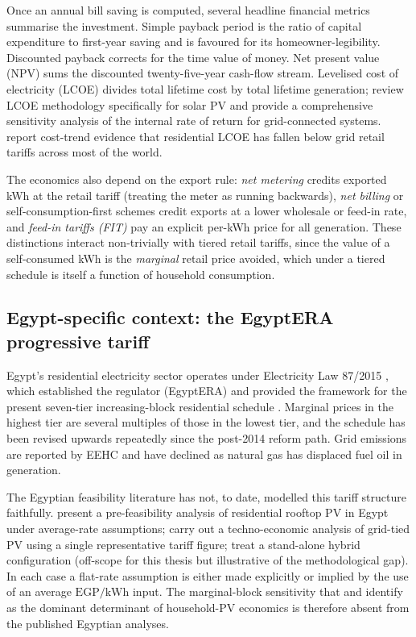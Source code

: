 Once an annual bill saving is computed, several headline financial
metrics summarise the investment. Simple payback period is the
ratio of capital expenditure to first-year saving and is favoured for
its homeowner-legibility. Discounted payback corrects for the time
value of money. Net present value (NPV) sums the discounted
twenty-five-year cash-flow stream. Levelised cost of electricity
(LCOE) divides total lifetime cost by total lifetime generation;
\citet{branker2011} review LCOE methodology specifically for solar PV
and \citet{talavera2010} provide a comprehensive sensitivity analysis
of the internal rate of return for grid-connected systems.
\citet{irena2023} report cost-trend evidence that residential LCOE has
fallen below grid retail tariffs across most of the world.

The economics also depend on the export rule: \emph{net metering}
credits exported kWh at the retail tariff (treating the meter as
running backwards), \emph{net billing} or self-consumption-first
schemes credit exports at a lower wholesale or feed-in rate, and
\emph{feed-in tariffs (FIT)} pay an explicit per-kWh price for all
generation. These distinctions interact non-trivially with tiered
retail tariffs, since the value of a self-consumed kWh is the
\emph{marginal} retail price avoided, which under a tiered schedule
is itself a function of household consumption.

\subsection{Egypt-specific context: the EgyptERA progressive tariff}
\label{sec:lit-tariff-egypt}

Egypt's residential electricity sector operates under Electricity Law
87/2015 \citep{egypt-electricity-act}, which established the
regulator (EgyptERA) and provided the framework for the present
seven-tier increasing-block residential schedule
\citep{egyptera_tariff}. Marginal prices in the highest tier are
several multiples of those in the lowest tier, and the schedule has
been revised upwards repeatedly since the post-2014 reform path. Grid
emissions are reported by EEHC \citep{eehc_emissions} and have
declined as natural gas has displaced fuel oil in generation.

The Egyptian feasibility literature has not, to date, modelled this
tariff structure faithfully. \citet{mahmoud2023} present a
pre-feasibility analysis of residential rooftop PV in Egypt under
average-rate assumptions; \citet{esmail-negm-2021} carry out a
techno-economic analysis of grid-tied PV using a single representative
tariff figure; \citet{mohamed2020} treat a stand-alone hybrid
configuration (off-scope for this thesis but illustrative of the
methodological gap). In each case a flat-rate assumption is either
made explicitly or implied by the use of an average $\mathrm{EGP/kWh}$
input. The marginal-block sensitivity that
\citet{borenstein2012} and \citet{darghouth2011} identify as the
dominant determinant of household-PV economics is therefore absent
from the published Egyptian analyses.

